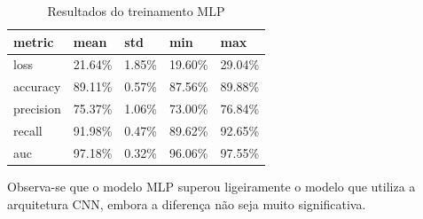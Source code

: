 \begin{table}[H]
    \centering
    \caption{Resultados do treinamento MLP}
    \label{tab:train_mlp}
    \begin{tabular}{@{}lllll@{}}
        \toprule
        \textbf{metric} & \textbf{mean} & \textbf{std} & \textbf{min} & \textbf{max} \\
        \midrule
        loss & 21.64\% & 1.85\% & 19.60\% & 29.04\% \\
        accuracy & 89.11\% & 0.57\% & 87.56\% & 89.88\% \\
        precision & 75.37\% & 1.06\% & 73.00\% & 76.84\% \\
        recall & 91.98\% & 0.47\% & 89.62\% & 92.65\% \\
        auc & 97.18\% & 0.32\% & 96.06\% & 97.55\% \\
        \bottomrule
    \end{tabular}
\end{table}

Observa-se que o modelo MLP superou ligeiramente o modelo que utiliza a arquitetura CNN, embora a diferença não seja muito significativa. 
